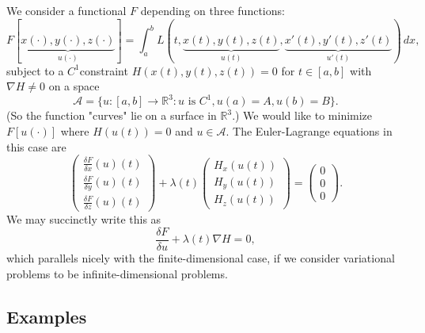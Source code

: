 \documentclass[11pt]{article}
\newcommand{\R}{\mathbb{R}}
\begin{document}
We consider a functional $F$ depending on three functions:
\[
F[\underbrace{x(\cdot), y(\cdot), z(\cdot)}_{u(\cdot)}] = \int_a^b L(t, \underbrace{x(t), y(t), z(t)}_{u(t)}, \underbrace{x'(t), y'(t), z'(t)}_{u'(t)}) \, dx,
\]
subject to a $C^1$constraint $H(x(t),y(t),z(t)) = 0$ for $t \in [a, b]$ with $\nabla H \neq 0$ on a space 
\[
\mathcal{A} = \{ u : [a, b] \to \R^3 : u \text{ is } C^1, u(a) = A, u(b) = B \}.
\] 
(So the function "curves" lie on a surface in $\R^3$.) We would like to minimize $F[u(\cdot)]$ where $H(u(t)) = 0$ and $u \in \mathcal{A}$. The Euler-Lagrange equations in this case are
\[
\begin{pmatrix}
\frac{\delta F}{\delta x}(u)(t) \\
\frac{\delta F}{\delta y}(u)(t) \\
\frac{\delta F}{\delta z}(u)(t)
\end{pmatrix} + \lambda(t) \begin{pmatrix}
H_x(u(t)) \\
H_y(u(t)) \\
H_z(u(t))
\end{pmatrix} = \begin{pmatrix}
0 \\ 0 \\ 0
\end{pmatrix}.
\]
We may succinctly write this as
\[
\frac{\delta F}{\delta u} + \lambda (t) \nabla H = 0,
\]
which parallels nicely with the finite-dimensional case, if we consider variational problems to be infinite-dimensional problems.

\subsection{Examples}
\end{document}
